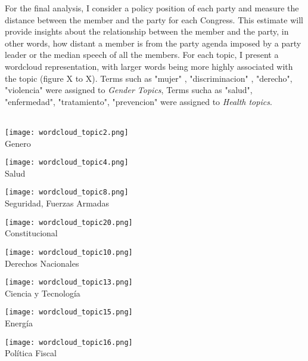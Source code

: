 \documentclass{article}
\begin{document}
For the final analysis, I consider a policy position of each party and measure the distance between the member and the party for each Congress. This estimate will provide insights about the relationship between the member and the party, in other words, how distant a member is from the party agenda imposed by a party leader or the median speech of all the members. For each topic, I present a wordcloud representation, with larger words being more highly associated with the topic (figure X to X). Terms such as "mujer" , "discriminacion" , "derecho",  "violencia" were assigned to \textit{Gender Topics}, Terms sucha as "salud", "enfermedad", "tratamiento", "prevencion" were assigned to \textit{Health topics}. \\
\\
\begin{minipage}{0.25\textwidth}\raggedleft
	\texttt{[image: wordcloud\_topic2.png]} \\
	\centering \scriptsize{Genero}
\end{minipage}
\begin{minipage}{0.25\textwidth}\raggedleft
	\texttt{[image: wordcloud\_topic4.png]} \\
	\centering \scriptsize{Salud}
\end{minipage}
\begin{minipage}{0.25\textwidth}\raggedleft
	\texttt{[image: wordcloud\_topic8.png]} \\
	\centering \scriptsize{Seguridad, Fuerzas Armadas}
\end{minipage}
\begin{minipage}{0.25\textwidth}\raggedleft
	\texttt{[image: wordcloud\_topic20.png]} \\
	\centering \scriptsize{Constitucional}
\end{minipage}
\begin{minipage}{0.25\textwidth}\raggedleft
	\texttt{[image: wordcloud\_topic10.png]} \\
	\centering \scriptsize{Derechos Nacionales }
\end{minipage}
\begin{minipage}{0.25\textwidth}\raggedleft
	\texttt{[image: wordcloud\_topic13.png]} \\
	\centering \scriptsize{Ciencia y Tecnología}
\end{minipage}
\begin{minipage}{0.25\textwidth}\raggedleft
	\texttt{[image: wordcloud\_topic15.png]} \\
	\centering \scriptsize{Energía}
\end{minipage}
\begin{minipage}{0.25\textwidth}\raggedleft
	\texttt{[image: wordcloud\_topic16.png]} \\
	\centering \scriptsize{Política Fiscal}
\end{minipage}
\end{document}
